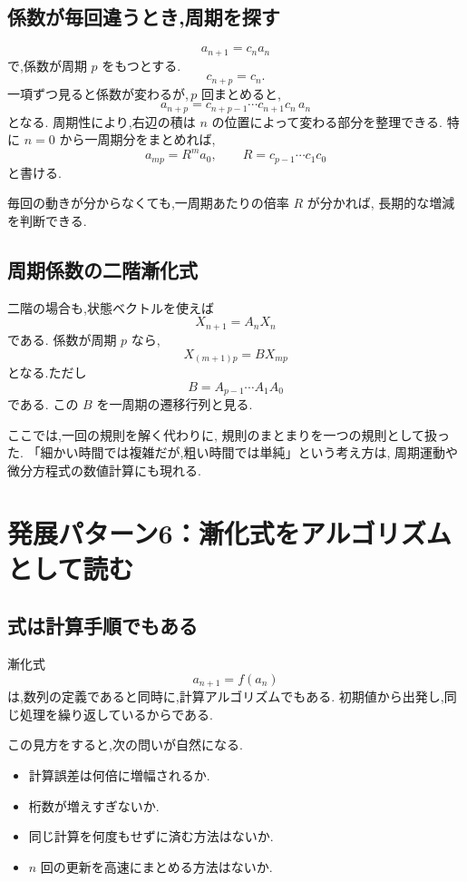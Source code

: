 \subsection{係数が毎回違うとき,周期を探す}

\[
  a_{n+1}=c_n a_n
\]
で,係数が周期 $p$ をもつとする.
\[
  c_{n+p}=c_n.
\]
一項ずつ見ると係数が変わるが,\,$p$ 回まとめると,
\[
  a_{n+p}
  =c_{n+p-1}\cdots c_{n+1}c_n\,a_n
\]
となる.
周期性により,右辺の積は $n$ の位置によって変わる部分を整理できる.
特に $n=0$ から一周期分をまとめれば,
\[
  a_{mp}=R^m a_0,\qquad
  R=c_{p-1}\cdots c_1c_0
\]
と書ける.

毎回の動きが分からなくても,一周期あたりの倍率 $R$ が分かれば,
長期的な増減を判断できる.

\subsection{周期係数の二階漸化式}

二階の場合も,状態ベクトルを使えば
\[
  X_{n+1}=A_nX_n
\]
である.
係数が周期 $p$ なら,
\[
  X_{(m+1)p}=BX_{mp}
\]
となる.ただし
\[
  B=A_{p-1}\cdots A_1A_0
\]
である.
この $B$ を一周期の遷移行列と見る.

ここでは,一回の規則を解く代わりに,
規則のまとまりを一つの規則として扱った.
「細かい時間では複雑だが,粗い時間では単純」という考え方は,
周期運動や微分方程式の数値計算にも現れる.

\section{発展パターン6：漸化式をアルゴリズムとして読む}

\subsection{式は計算手順でもある}

漸化式
\[
  a_{n+1}=f(a_n)
\]
は,数列の定義であると同時に,計算アルゴリズムでもある.
初期値から出発し,同じ処理を繰り返しているからである.

この見方をすると,次の問いが自然になる.

\begin{itemize}
  \item 計算誤差は何倍に増幅されるか.
  \item 桁数が増えすぎないか.
  \item 同じ計算を何度もせずに済む方法はないか.
  \item $n$ 回の更新を高速にまとめる方法はないか.
\end{itemize}

